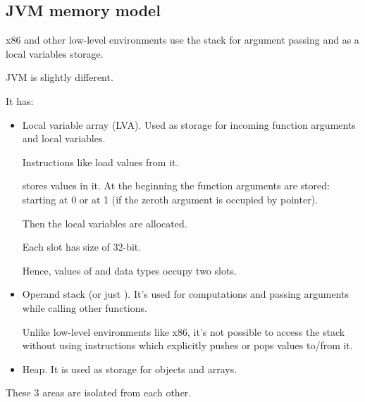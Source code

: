 \subsection{\ac{JVM} memory model}

x86 and other low-level environments use the stack for argument passing and 
as a local variables storage.

\ac{JVM} is slightly different.

It has:

\begin{itemize}
\item Local variable array (\ac{LVA}).
Used as storage for incoming function arguments and local variables.

Instructions like  load values from it.

 stores values in it.
At the beginning the function arguments are stored: starting at 0 or at 1 
(if the zeroth argument is occupied by  pointer).

Then the local variables are allocated.


Each slot has size of 32-bit.

Hence, values of  and  data types occupy two slots.


\item Operand stack (or just ).
It's used for computations and passing arguments while calling other functions.

Unlike low-level environments like x86, it's not possible to access the stack without using
instructions which explicitly pushes or pops values to/from it.


\item Heap. It is used as storage for objects and arrays.

\end{itemize}

These 3 areas are isolated from each other.

